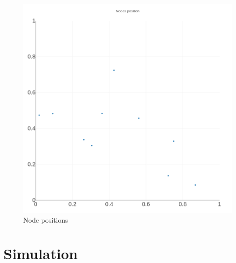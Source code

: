\documentclass[conference]{IEEEtran}
\begin{document}
\begin{figure}[t]
    \centering
    \includegraphics[width=\columnwidth]{graphs/NodesPositions}
    \caption{Node positions}
    \label{fig:nodespositions}
\end{figure}

\section{Simulation}\label{sec:simulation}
\end{document}
